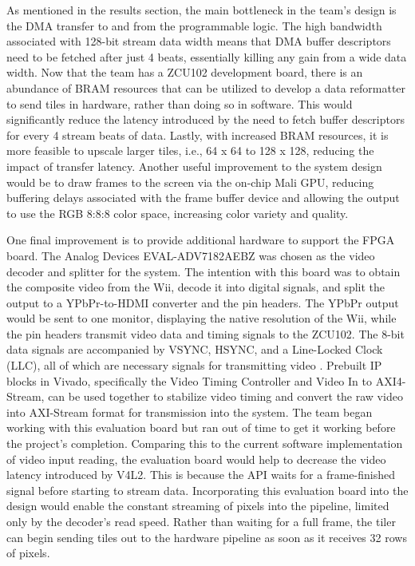 \documentclass{article}
\begin{document}
\par As mentioned in the results section, the main bottleneck in the team’s design is the DMA transfer to and from the programmable logic. The high bandwidth associated with 128-bit stream data width means that DMA buffer descriptors need to be fetched after just 4 beats, essentially killing any gain from a wide data width. Now that the team has a ZCU102 development board, there is an abundance of BRAM resources that can be utilized to develop a data reformatter to send tiles in hardware, rather than doing so in software. This would significantly reduce the latency introduced by the need to fetch buffer descriptors for every 4 stream beats of data. Lastly, with increased BRAM resources, it is more feasible to upscale larger tiles, i.e., 64 x 64 to 128 x 128, reducing the impact of transfer latency. Another useful improvement to the system design would be to draw frames to the screen via the on-chip Mali GPU, reducing buffering delays associated with the frame buffer device and allowing the output to use the RGB 8:8:8 color space, increasing color variety and quality.

\par 	One final improvement is to provide additional hardware to support the FPGA board. The Analog Devices EVAL-ADV7182AEBZ was chosen as the video decoder and splitter for the system. The intention with this board was to obtain the composite video from the Wii, decode it into digital signals, and split the output to a YPbPr-to-HDMI converter and the pin headers. The YPbPr output would be sent to one monitor, displaying the native resolution of the Wii, while the pin headers transmit video data and timing signals to the ZCU102. The 8-bit data signals are accompanied by VSYNC, HSYNC, and a Line-Locked Clock (LLC), all of which are necessary signals for transmitting video \cite{analog2025adv7182a}. Prebuilt IP blocks in Vivado, specifically the Video Timing Controller and Video In to AXI4-Stream, can be used together to stabilize video timing and convert the raw video into AXI-Stream format for transmission into the system. The team began working with this evaluation board but ran out of time to get it working before the project's completion. Comparing this to the current software implementation of video input reading, the evaluation board would help to decrease the video latency introduced by V4L2. This is because the API waits for a frame-finished signal before starting to stream data. Incorporating this evaluation board into the design would enable the constant streaming of pixels into the pipeline, limited only by the decoder's read speed. Rather than waiting for a full frame, the tiler can begin sending tiles out to the hardware pipeline as soon as it receives 32 rows of pixels. 
\end{document}
